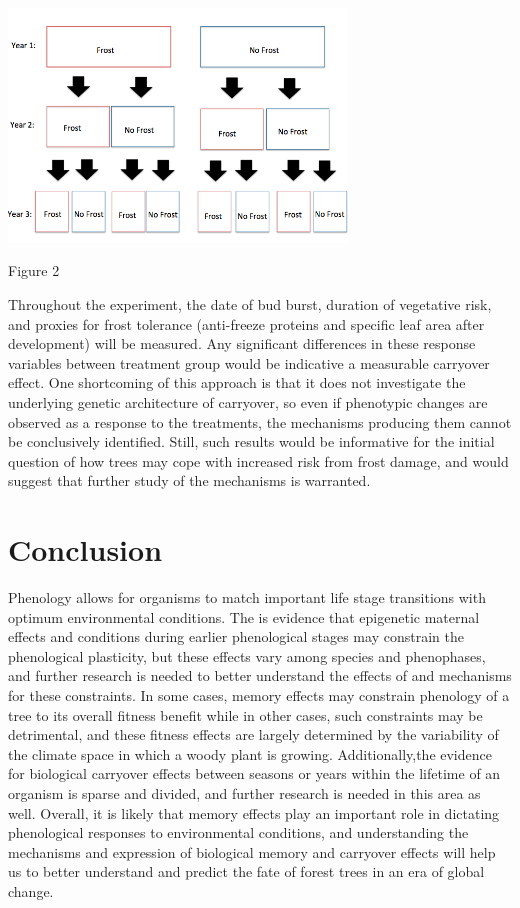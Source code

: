 \documentclass{article}\usepackage[]{graphicx}\usepackage[]{color}
\begin{document}
\begin{center}
\includegraphics[width=9cm] {carryover_diagram}
\caption{Figure 2}
\end{center}
Throughout the experiment, the date of bud burst, duration of vegetative risk, and proxies for frost tolerance (anti-freeze proteins and specific leaf area after development) will be measured. Any significant differences in these response variables between treatment group would be indicative a measurable carryover effect. One shortcoming of this approach is that it does not investigate the underlying genetic architecture of carryover, so even if phenotypic changes are observed as a response to the treatments, the mechanisms producing them cannot be conclusively identified. Still, such results would be informative for the initial question of how trees may cope with increased risk from frost damage, and would suggest that further study of the mechanisms is warranted.
\section*{Conclusion}
\par Phenology allows for organisms to match important life stage transitions with optimum environmental conditions. The is evidence that epigenetic maternal effects and conditions during earlier phenological stages may constrain the phenological plasticity, but these effects vary among species and phenophases, and further research is needed to better understand the effects of and mechanisms for these constraints. In some cases, memory effects may constrain phenology of a tree to its overall fitness benefit while in other cases, such constraints may be detrimental, and these fitness effects are largely determined by the variability of the climate space in which a woody plant is growing. Additionally,the evidence for biological carryover effects between seasons or years within the lifetime of an organism is sparse and divided, and further research is needed in this area as well. Overall, it is likely that memory effects play an important role in dictating phenological responses to environmental conditions, and understanding the mechanisms and expression of biological memory and carryover effects will help us to better understand and predict the fate of forest trees in an era of global change. 



\end{document}
